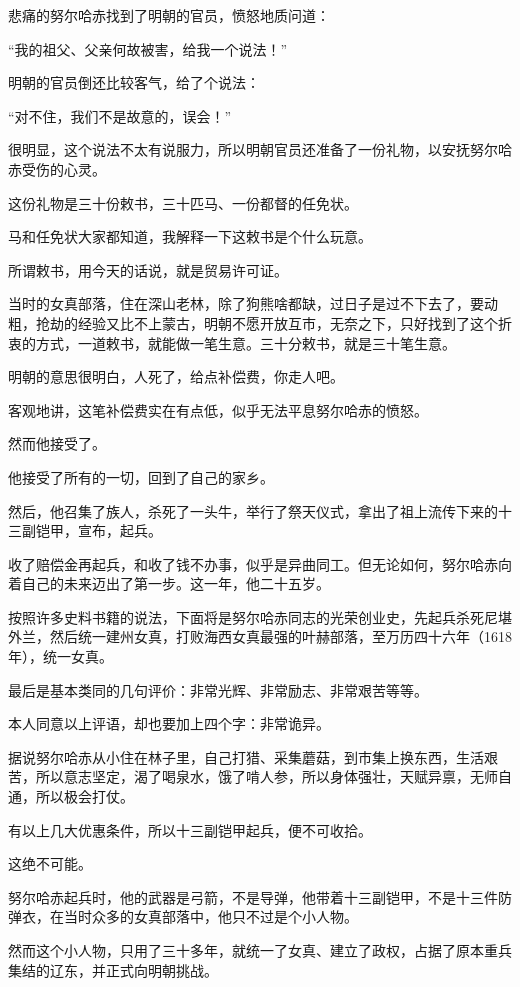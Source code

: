 \begin{multicols}{\theparacolNo}
		悲痛的努尔哈赤找到了明朝的官员，愤怒地质问道：

		“我的祖父、父亲何故被害，给我一个说法！”

		明朝的官员倒还比较客气，给了个说法：

		“对不住，我们不是故意的，误会！”

		很明显，这个说法不太有说服力，所以明朝官员还准备了一份礼物，以安抚努尔哈赤受伤的心灵。

		这份礼物是三十份敕书，三十匹马、一份都督的任免状。

		马和任免状大家都知道，我解释一下这敕书是个什么玩意。

		所谓敕书，用今天的话说，就是贸易许可证。

		当时的女真部落，住在深山老林，除了狗熊啥都缺，过日子是过不下去了，要动粗，抢劫的经验又比不上蒙古，明朝不愿开放互市，无奈之下，只好找到了这个折衷的方式，一道敕书，就能做一笔生意。三十分敕书，就是三十笔生意。

		明朝的意思很明白，人死了，给点补偿费，你走人吧。

		客观地讲，这笔补偿费实在有点低，似乎无法平息努尔哈赤的愤怒。

		然而他接受了。

		他接受了所有的一切，回到了自己的家乡。

		然后，他召集了族人，杀死了一头牛，举行了祭天仪式，拿出了祖上流传下来的十三副铠甲，宣布，起兵。

		收了赔偿金再起兵，和收了钱不办事，似乎是异曲同工。但无论如何，努尔哈赤向着自己的未来迈出了第一步。这一年，他二十五岁。

		按照许多史料书籍的说法，下面将是努尔哈赤同志的光荣创业史，先起兵杀死尼堪外兰，然后统一建州女真，打败海西女真最强的叶赫部落，至万历四十六年（1618年），统一女真。

		最后是基本类同的几句评价：非常光辉、非常励志、非常艰苦等等。

		本人同意以上评语，却也要加上四个字：非常诡异。

		据说努尔哈赤从小住在林子里，自己打猎、采集蘑菇，到市集上换东西，生活艰苦，所以意志坚定，渴了喝泉水，饿了啃人参，所以身体强壮，天赋异禀，无师自通，所以极会打仗。

		有以上几大优惠条件，所以十三副铠甲起兵，便不可收拾。

		这绝不可能。

		努尔哈赤起兵时，他的武器是弓箭，不是导弹，他带着十三副铠甲，不是十三件防弹衣，在当时众多的女真部落中，他只不过是个小人物。

		然而这个小人物，只用了三十多年，就统一了女真、建立了政权，占据了原本重兵集结的辽东，并正式向明朝挑战。


\end{multicols}
